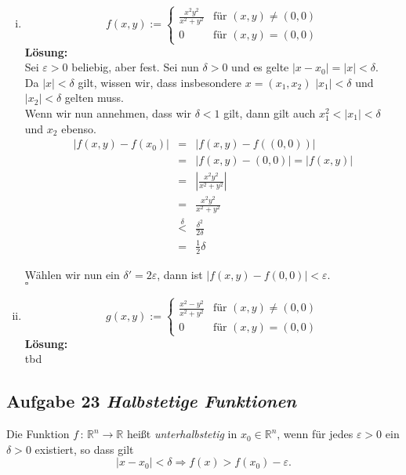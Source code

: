 \documentclass[11pt,a4paper,ngerman]{article}
\begin{document}
\begin{enumerate}[(i)]
	\item
		$$
			f(x,y) := \left\{ 
			\begin{array}{lr}
				\frac{x^2y^2}{x^2+y^2} & \text{für }(x,y)\not= (0,0)\\
				0& \text{für }(x,y) = (0,0)
			\end{array}\right.
		$$
	\textbf{Lösung:}\\
		Sei $\varepsilon > 0$ beliebig, aber fest. Sei nun $\delta > 0$ und es gelte $|x - x_0| = |x| < \delta$.\\
		Da $|x| < \delta$ gilt, wissen wir, dass insbesondere $x=(x_1,x_2)$ $|x_1| < \delta $ und $|x_2| < \delta$ gelten muss.\\
		Wenn wir nun annehmen, dass wir $\delta < 1 $ gilt, dann gilt auch $x_1^2 < |x_1| < \delta$ und $x_2$ ebenso.\\

		$$\begin{array}{rcl}
			|f(x,y) - f(x_0)| &=& | f(x,y) - f((0,0)) |\\
				&=& |f(x,y) - (0,0)| = |f(x,y)|\\
				&=& | \frac{x^2y^2}{x^2 + y^2} |\\
				&=& \frac{x^2 y^2}{x^2 + y^2}\\
				&\stackrel{\delta}{<}& \frac{\delta^2}{2\delta}\\
				&=& \frac{1}{2} \delta
		\end{array}$$

		Wählen wir nun ein $\delta ' = 2 \varepsilon$, dann ist $|f(x,y) - f(0,0)| < \varepsilon$.\\
		\mbox{} \hfill $\square$

	\item
		$$
			g(x,y) := \left\{
				\begin{array}{lr}
					\frac{x^2 - y^2}{x^2 + y^2} & \text{für }(x,y) \not= (0,0) \\
					0 & \text{für } (x,y) = (0,0)
				\end{array}
			\right.
		$$
	\textbf{Lösung:}\\
		tbd
\end{enumerate}

\subsection*{Aufgabe 23 \mdseries\itshape Halbstetige Funktionen}

Die Funktion $f \, : \, \mathbb{R}^n \rightarrow \mathbb{R}$ heißt \emph{unterhalbstetig} in $x_0 \in \mathbb{R}^n$, wenn für jedes $\varepsilon > 0$ ein $\delta > 0$ existiert, so dass gilt
	$$
		| x - x_0 | < \delta \Rightarrow f(x) > f(x_0) - \varepsilon.
	$$
\end{document}
